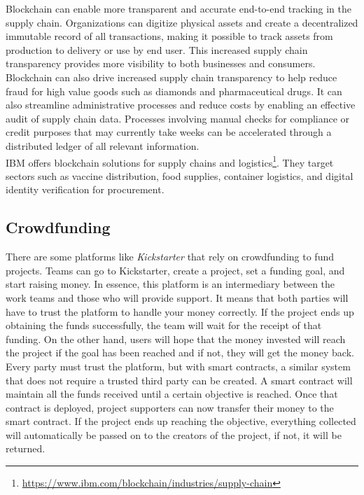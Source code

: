 \documentclass[10pt]{article}
\begin{document}
\begin{multicols}{2}
Blockchain can enable more transparent and accurate end-to-end tracking in the supply chain. Organizations can digitize physical assets and create a decentralized immutable record of all transactions, making it possible to track assets from production to delivery or use by end user. This increased supply chain transparency provides more visibility to both businesses and consumers.\\

Blockchain can also drive increased supply chain transparency to help reduce fraud for high value goods such as diamonds and pharmaceutical drugs. It can also streamline administrative processes and reduce costs by enabling an effective audit of supply chain data. Processes involving manual checks for compliance or credit purposes that may currently take weeks can be accelerated through a distributed ledger of all relevant information.\\

IBM offers blockchain solutions for supply chains and logistics\footnote{\url{https://www.ibm.com/blockchain/industries/supply-chain}}. They target sectors such as vaccine distribution, food supplies, container logistics, and digital identity verification for procurement.

\subsection{Crowdfunding}

There are some platforms like \textit{Kickstarter} that rely on crowdfunding to fund projects. Teams can go to Kickstarter, create a project, set a funding goal, and start raising money. In essence, this platform is an intermediary between the work teams and those who will provide support. It means that both parties will have to trust the platform to handle your money correctly. If the project ends up obtaining the funds successfully, the team will wait for the receipt of that funding. On the other hand, users will hope that the money invested will reach the project if the goal has been reached and if not, they will get the money back.\\

Every party must trust the platform, but with smart contracts, a similar system that does not require a trusted third party can be created. A smart contract will maintain all the funds received until a certain objective is reached. Once that contract is deployed, project supporters can now transfer their money to the smart contract. If the project ends up reaching the objective, everything collected will automatically be passed on to the creators of the project, if not, it will be returned.


\end{multicols}
\end{document}

